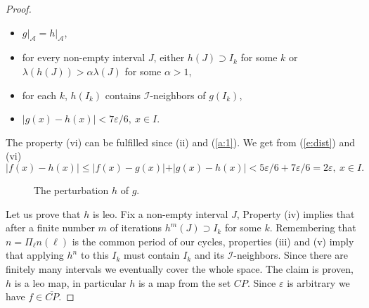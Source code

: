 \documentclass[12pt, a4paper]{amsart}
\def\eps{\varepsilon}
\def\red{\color{red}}
\def\le{\leqslant}
\newcommand{\?}{{\bf ???}}
\begin{document}
\begin{proof}
\begin{itemize}
\item[(iii)] $g\vert_{\mathcal A}=h\vert_{\mathcal A}$,
\item[(iv)] for every non-empty interval $J$, either $h(J)\supset I_k$ for some $k$ or $\lambda(h(J))>\alpha\lambda(J)$ for some $\alpha>1$, 
\item[(v)] for each $k$, $h(I_k)$ contains $\mathcal I$-neighbors of $g(I_k)$,
\item[(vi)] $\vert g(x)-h(x)\vert<7\eps/6,~x\in I.$
\end{itemize}
The property (vi) can be fulfilled since (ii) and (\ref{a:1}). We get from (\ref{e:dist}) and (vi) 
\begin{equation}
\vert f(x)-h(x)\vert\le \vert f(x)-g(x)\vert+\vert g(x)-h(x)\vert<5\eps/6+7\eps/6=2\eps,~x\in I.
    \end{equation}
    
    \begin{figure}
       \caption{The perturbation $h$ of $g$.}\label{fig:perturbation}
    \end{figure}
    
    Let us prove that $h$ is leo. Fix a non-empty interval $J$, Property (iv) implies that after a finite number $m$ of iterations $h^m(J) \supset I_k$ for some $k$.  
 Remembering that $n=\Pi_{\ell}n(\ell)$ is the common period of our cycles, properties (iii) and (v) imply that applying $h^n$ to this $I_k$ must contain $I_k$ and its $\mathcal{I}$-neighbors. 
     Since there are finitely many intervals we eventually  cover the whole space.
    The claim is proven,  $h$ is a leo map, in particular $h$ is a map from the set $CP$. Since $\eps$ is arbitrary we have $f \in \overline{CP}$.  
    

\end{proof}
\end{document}
